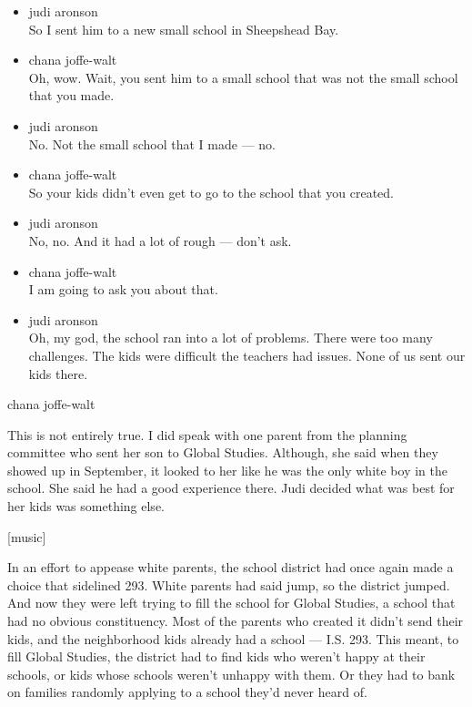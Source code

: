 \begin{itemize}
\item
  judi aronson\\
  So I sent him to a new small school in Sheepshead Bay.
\item
  chana joffe-walt\\
  Oh, wow. Wait, you sent him to a small school that was not the small
  school that you made.
\item
  judi aronson\\
  No. Not the small school that I made --- no.
\item
  chana joffe-walt\\
  So your kids didn't even get to go to the school that you created.
\item
  judi aronson\\
  No, no. And it had a lot of rough --- don't ask.
\item
  chana joffe-walt\\
  I am going to ask you about that.
\item
  judi aronson\\
  Oh, my god, the school ran into a lot of problems. There were too many
  challenges. The kids were difficult the teachers had issues. None of
  us sent our kids there.
\end{itemize}

chana joffe-walt

This is not entirely true. I did speak with one parent from the planning
committee who sent her son to Global Studies. Although, she said when
they showed up in September, it looked to her like he was the only white
boy in the school. She said he had a good experience there. Judi decided
what was best for her kids was something else.

{[}music{]}

In an effort to appease white parents, the school district had once
again made a choice that sidelined 293. White parents had said jump, so
the district jumped. And now they were left trying to fill the school
for Global Studies, a school that had no obvious constituency. Most of
the parents who created it didn't send their kids, and the neighborhood
kids already had a school --- I.S. 293. This meant, to fill Global
Studies, the district had to find kids who weren't happy at their
schools, or kids whose schools weren't unhappy with them. Or they had to
bank on families randomly applying to a school they'd never heard of.

